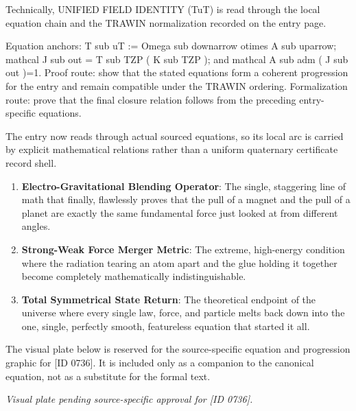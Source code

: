Technically, UNIFIED FIELD IDENTITY (TuT) is read through the local equation chain and the TRAWIN normalization recorded on the entry page.

Equation anchors: T sub uT := Omega sub downarrow otimes A sub uparrow; mathcal J sub out = T sub TZP ( K sub TZP ); and mathcal A sub adm ( J sub out )=1. Proof route: show that the stated equations form a coherent progression for the entry and remain compatible under the TRAWIN ordering. Formalization route: prove that the final closure relation follows from the preceding entry-specific equations.

The entry now reads through actual sourced equations, so its local arc is carried by explicit mathematical relations rather than a uniform quaternary certificate record shell.
\endgroup

\begin{enumerate}[leftmargin=1.6em,itemsep=6pt,topsep=4pt]
\item \textbf{Electro-Gravitational Blending Operator}: The single, staggering line of math that finally, flawlessly proves that the pull of a magnet and the pull of a planet are exactly the same fundamental force just looked at from different angles.
\item \textbf{Strong-Weak Force Merger Metric}: The extreme, high-energy condition where the radiation tearing an atom apart and the glue holding it together become completely mathematically indistinguishable.
\item \textbf{Total Symmetrical State Return}: The theoretical endpoint of the universe where every single law, force, and particle melts back down into the one, single, perfectly smooth, featureless equation that started it all.
\end{enumerate}

\begingroup\footnotesize\sloppy
The visual plate below is reserved for the source-specific equation and progression graphic for [ID 0736]. It is included only as a companion to the canonical equation, not as a substitute for the formal text.
\par\endgroup
\begingroup\footnotesize\itshape
Visual plate pending source-specific approval for [ID 0736].
\par\endgroup

